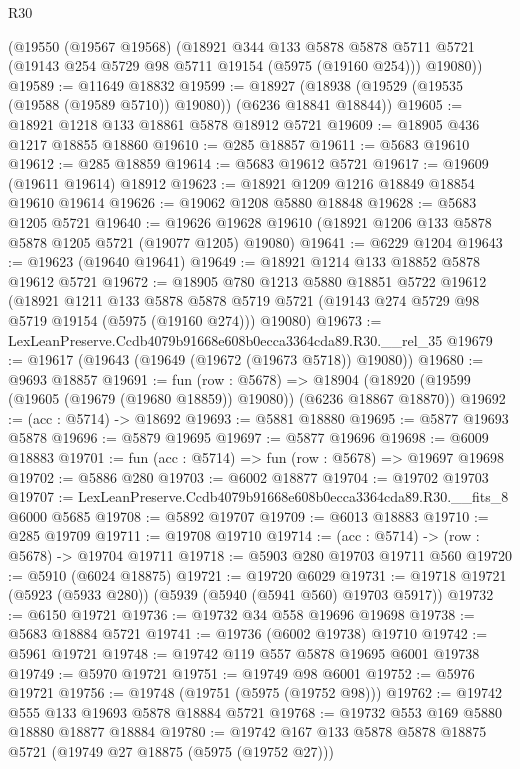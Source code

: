 \begin{lexlean}{R30}
\begin{coremodule}
    (@19550
      (@19567 @19568)
      (@18921
        @344
        @133
        @5878
        @5878
        @5711
        @5721
        (@19143 @254 @5729 @98 @5711 @19154 (@5975 (@19160 @254)))
        @19080))
@19589 := @11649 @18832
@19599 := @18927 (@18938 (@19529 (@19535 (@19588 (@19589 @5710)) @19080)) (@6236 @18841 @18844))
@19605 := @18921 @1218 @133 @18861 @5878 @18912 @5721
@19609 := @18905 @436 @1217 @18855 @18860
@19610 := @285 @18857
@19611 := @5683 @19610
@19612 := @285 @18859
@19614 := @5683 @19612 @5721
@19617 := @19609 (@19611 @19614) @18912
@19623 := @18921 @1209 @1216 @18849 @18854 @19610 @19614
@19626 := @19062 @1208 @5880 @18848
@19628 := @5683 @1205 @5721
@19640 := @19626 @19628 @19610 (@18921 @1206 @133 @5878 @5878 @1205 @5721 (@19077 @1205) @19080)
@19641 := @6229 @1204
@19643 := @19623 (@19640 @19641)
@19649 := @18921 @1214 @133 @18852 @5878 @19612 @5721
@19672 := @18905
    @780
    @1213
    @5880
    @18851
    @5722
    @19612
    (@18921
      @1211
      @133
      @5878
      @5878
      @5719
      @5721
      (@19143 @274 @5729 @98 @5719 @19154 (@5975 (@19160 @274)))
      @19080)
@19673 := LexLeanPreserve.Ccdb4079b91668e608b0ecca3364cda89.R30.__rel_35
@19679 := @19617 (@19643 (@19649 (@19672 (@19673 @5718)) @19080))
@19680 := @9693 @18857
@19691 := fun (row : @5678) =>
  @18904 (@18920 (@19599 (@19605 (@19679 (@19680 @18859)) @19080)) (@6236 @18867 @18870))
@19692 := (acc : @5714) -> @18692
@19693 := @5881 @18880
@19695 := @5877 @19693 @5878
@19696 := @5879 @19695
@19697 := @5877 @19696
@19698 := @6009 @18883
@19701 := fun (acc : @5714) => fun (row : @5678) => @19697 @19698
@19702 := @5886 @280
@19703 := @6002 @18877
@19704 := @19702 @19703
@19707 := LexLeanPreserve.Ccdb4079b91668e608b0ecca3364cda89.R30.__fits_8 @6000 @5685
@19708 := @5892 @19707
@19709 := @6013 @18883
@19710 := @285 @19709
@19711 := @19708 @19710
@19714 := (acc : @5714) -> (row : @5678) -> @19704 @19711
@19718 := @5903 @280 @19703 @19711 @560
@19720 := @5910 (@6024 @18875)
@19721 := @19720 @6029
@19731 := @19718 @19721 (@5923 (@5933 @280)) (@5939 (@5940 (@5941 @560) @19703 @5917))
@19732 := @6150 @19721
@19736 := @19732 @34 @558 @19696 @19698
@19738 := @5683 @18884 @5721
@19741 := @19736 (@6002 @19738) @19710
@19742 := @5961 @19721
@19748 := @19742 @119 @557 @5878 @19695 @6001 @19738
@19749 := @5970 @19721
@19751 := @19749 @98 @6001
@19752 := @5976 @19721
@19756 := @19748 (@19751 (@5975 (@19752 @98)))
@19762 := @19742 @555 @133 @19693 @5878 @18884 @5721
@19768 := @19732 @553 @169 @5880 @18880 @18877 @18884
@19780 := @19742 @167 @133 @5878 @5878 @18875 @5721 (@19749 @27 @18875 (@5975 (@19752 @27)))

\end{coremodule}
\end{lexlean}
